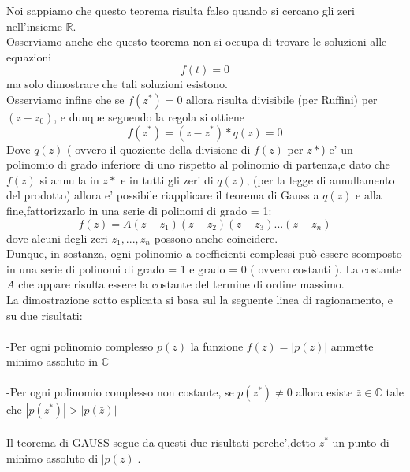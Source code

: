 \documentclass[fontsize = 20px, paper = a4]{article}
\begin{document}
Noi sappiamo che questo teorema risulta falso quando si cercano gli zeri nell'insieme $\mathbb{R}$.\\
Osserviamo anche che questo teorema non si occupa di trovare le soluzioni alle equazioni $$f(t) = 0$$ ma solo dimostrare che tali soluzioni esistono.\\
Osserviamo infine che se $f(z^*) = 0$ allora risulta divisibile (per Ruffini) per $(z - z_{0})$, e dunque seguendo la regola si ottiene $$f(z^*) = (z - z^*) * q(z) = 0$$
Dove $q(z)$ ( ovvero il quoziente della divisione di $f(z)$ per $z*$) e' un polinomio di grado inferiore di uno rispetto al polinomio di partenza,e dato che $f(z)$ si annulla in $z*$ e in tutti gli zeri di $q(z)$, (per la legge di annullamento del prodotto) allora e' possibile riapplicare il teorema di Gauss a $q(z)$ e alla fine,fattorizzarlo in una serie di polinomi di grado = 1: $$f(z) = A(z-z_{1})(z-z_{2})(z-z_{3})...(z-z_{n})$$ dove alcuni degli zeri $z_{1},...,z_{n}$ possono anche coincidere.\\
Dunque, in sostanza, ogni polinomio a coefficienti complessi può essere scomposto in una serie di polinomi di grado = 1 e grado = 0 ( ovvero costanti ). La costante $A$ che appare risulta essere la costante del termine di ordine massimo.\\
La dimostrazione sotto esplicata si basa sul la seguente linea di ragionamento, e su due risultati:\\\\
\indent -Per ogni polinomio complesso $p(z)$ la funzione $f(z) = | p(z) |$ ammette \\ \indent           minimo assoluto in $\mathbb{C}$ \\\\
\indent -Per ogni polinomio complesso non costante, se $p(z^*) \neq 0$ allora esiste $\bar{z}\in \mathbb{C}$ \indent tale che $|p(z^*)| >|p(\bar{z})|$   \\ \\ 
Il teorema di GAUSS segue da questi due risultati perche',detto $z^*$ un punto di minimo assoluto di $|p(z)|$.
\newpage
\end{document}
